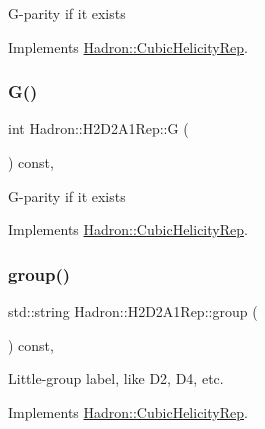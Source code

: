G-\/parity if it exists 

Implements \mbox{\hyperlink{structHadron_1_1CubicHelicityRep_a50689f42be1e6170aa8cf6ad0597018b}{Hadron\+::\+Cubic\+Helicity\+Rep}}.

\mbox{\label{structHadron_1_1H2D2A1Rep_a675ce644f7ba030fdfaf81297919a9c1}} 
\subsubsection{\texorpdfstring{G()}{G()}\hspace{0.1cm}{\footnotesize\ttfamily [2/2]}}
{\footnotesize\ttfamily int Hadron\+::\+H2\+D2\+A1\+Rep\+::G (\begin{DoxyParamCaption}{ }\end{DoxyParamCaption}) const\hspace{0.3cm}{\ttfamily [inline]}, {\ttfamily [virtual]}}

G-\/parity if it exists 

Implements \mbox{\hyperlink{structHadron_1_1CubicHelicityRep_a50689f42be1e6170aa8cf6ad0597018b}{Hadron\+::\+Cubic\+Helicity\+Rep}}.

\mbox{\label{structHadron_1_1H2D2A1Rep_a8e1e801312be98b0f43fff8d5d61f0a4}} 
\subsubsection{\texorpdfstring{group()}{group()}\hspace{0.1cm}{\footnotesize\ttfamily [1/3]}}
{\footnotesize\ttfamily std\+::string Hadron\+::\+H2\+D2\+A1\+Rep\+::group (\begin{DoxyParamCaption}{ }\end{DoxyParamCaption}) const\hspace{0.3cm}{\ttfamily [inline]}, {\ttfamily [virtual]}}

Little-\/group label, like D2, D4, etc. 

Implements \mbox{\hyperlink{structHadron_1_1CubicHelicityRep_a101a7d76cd8ccdad0f272db44b766113}{Hadron\+::\+Cubic\+Helicity\+Rep}}.

\mbox{\label{structHadron_1_1H2D2A1Rep_a8e1e801312be98b0f43fff8d5d61f0a4}} 
